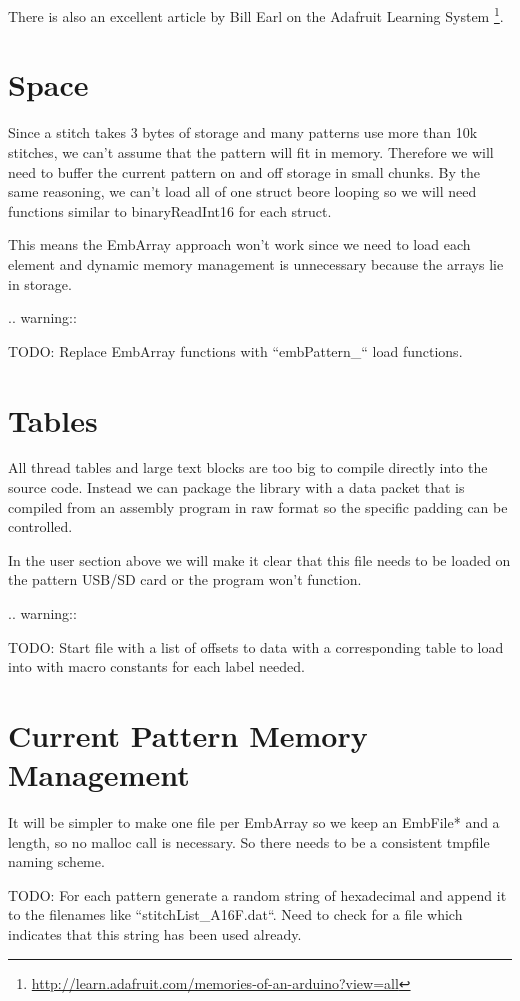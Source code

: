 \documentclass[a4paper]{report}
\begin{document}
There is also an excellent article by Bill Earl on the Adafruit Learning
System
\footnote{\url{http://learn.adafruit.com/memories-of-an-arduino?view=all}}.

\section{Space}

Since a stitch takes 3 bytes of storage and many patterns use more than
10k stitches, we can't assume that the pattern will fit in memory. Therefore
we will need to buffer the current pattern on and off storage in small
chunks. By the same reasoning, we can't load all of one struct beore
looping so we will need functions similar to binaryReadInt16 for each
struct.

This means the EmbArray approach won't work since we need to load
each element and dynamic memory management is unnecessary because
the arrays lie in storage.

.. warning::

   TODO: Replace EmbArray functions with ``embPattern\_`` load functions.

\section{Tables}

All thread tables and large text blocks are too big to compile directly
into the source code. Instead we can package the library with a data packet
that is compiled from an assembly program in raw format so the specific
padding can be controlled.

In the user section above we will make it clear that this file
needs to be loaded on the pattern USB/SD card or the program won't function.

.. warning::

   TODO: Start file with a list of offsets to data with a corresponding table
   to load into with macro constants for each label needed.

\section{Current Pattern Memory Management}

It will be simpler to make one file per EmbArray so we keep an EmbFile*
and a length, so no malloc call is necessary. So there needs to be a consistent
tmpfile naming scheme.

TODO: For each pattern generate a random string of hexadecimal and append it
to the filenames like ``stitchList\_A16F.dat``. Need to check for a file
which indicates that this string has been used already.
\end{document}
